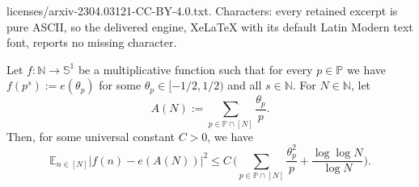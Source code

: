 \documentclass[10pt,a4paper]{amsart}
\newcommand{\E}{{\mathbb E}}
\newcommand{\N}{{\mathbb N}}
\renewcommand{\P}{{\mathbb P}}
\renewcommand{\S}{\mathbb{S}}
\begin{document}
licenses/arxiv-2304.03121-CC-BY-4.0.txt. Characters: every retained excerpt is pure ASCII, so the delivered engine, XeLaTeX with its default Latin Modern text font, reports no missing character.
	\begin{lemma}\label{L:thetap'}
	Let  $f\colon \N\to \S^1$ be a multiplicative function  such that for every $p\in\P$ we have   $f(p^s):=e(\theta_p)$ for some $\theta_p\in [-1/2,1/2)$ and  all $s\in \N$.  For $N\in \N$, let
	\begin{equation}\label{E:AN}
		A(N):=\sum_{p\in \P\cap [N]}  \frac{\theta_p}{p}.
	\end{equation}
	Then, for some  universal constant $C>0$,  we have
	\begin{equation}\label{E:ANest}
	\E_{n\in [N]}|f(n)-e(A(N))|^2\leq  C \,	\Big(\sum_{p\in \P\cap [N]} \frac{\theta_p^2}{p}+ \frac{\log\log{N}}{\log{N}}\Big).
	\end{equation}
\end{lemma}
\end{document}

